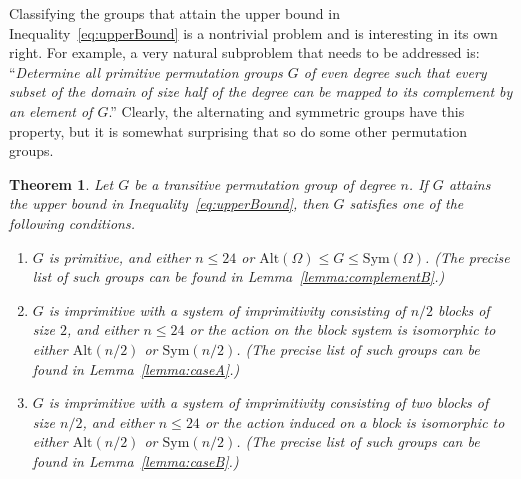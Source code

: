 \documentclass[a4paper]{amsart}
\newcommand{\Sym}{\mathrm{Sym}}
\newcommand{\Alt}{\mathrm{Alt}}
\newtheorem{thmx}{Theorem}[]
\theoremstyle{definition}
\begin{document}
Classifying the groups that attain the upper bound in Inequality~\eqref{eq:upperBound} is a nontrivial problem and is interesting in its own right.
For example, a very natural subproblem that needs to be addressed is:
``{\em Determine all primitive permutation groups $G$ of even degree such that every subset of the domain of size half of the degree can be mapped to its complement by an element of $G$}.'' 
Clearly, the alternating and symmetric groups have this property,
but it is somewhat surprising that so do some other permutation groups.

\begin{thmx}
\label{theorem:comput}
Let $G$ be a transitive permutation group of degree $n$. If $G$ attains the upper bound in Inequality~\eqref{eq:upperBound}, then $G$ satisfies one of the following conditions.
\begin{enumerate}[$(a)$]
    \item $G$ is primitive, and either $n \le 24$ or $\Alt(\Omega)\le G \le \Sym(\Omega)$. (The precise list of such groups can be found in Lemma~\ref{lemma:complementB}.)
    \item $G$ is imprimitive with a system of
    imprimitivity consisting of $n/2$ blocks of size $2$, and either $n\le 24$ or the action on the block system is isomorphic to either $\Alt(n/2)$ or $\Sym(n/2)$.  (The precise list of such groups can be found in Lemma~\ref{lemma:caseA}.)
    \item $G$ is imprimitive with a system of
    imprimitivity consisting of two blocks of size $n/2$, and either $n\le 24$ or the action induced on a block is isomorphic to either $\Alt(n/2)$ or $\Sym(n/2)$.
    (The precise list of such groups can be found in Lemma~\ref{lemma:caseB}.)
 \end{enumerate}
\end{thmx}
\end{document}
